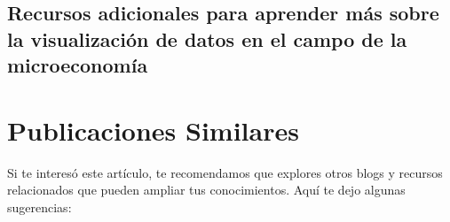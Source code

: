 \documentclass[
  a4paper,
]{article}
\begin{document}
\hypertarget{recursos-adicionales-para-aprender-muxe1s-sobre-la-visualizaciuxf3n-de-datos-en-el-campo-de-la-microeconomuxeda}{%
\subsection{Recursos adicionales para aprender más sobre la
visualización de datos en el campo de la
microeconomía}\label{recursos-adicionales-para-aprender-muxe1s-sobre-la-visualizaciuxf3n-de-datos-en-el-campo-de-la-microeconomuxeda}}

\hypertarget{publicaciones-similares}{%
\section{Publicaciones Similares}\label{publicaciones-similares}}

Si te interesó este artículo, te recomendamos que explores otros blogs y
recursos relacionados que pueden ampliar tus conocimientos. Aquí te dejo
algunas sugerencias:


\printbibliography
\end{document}
